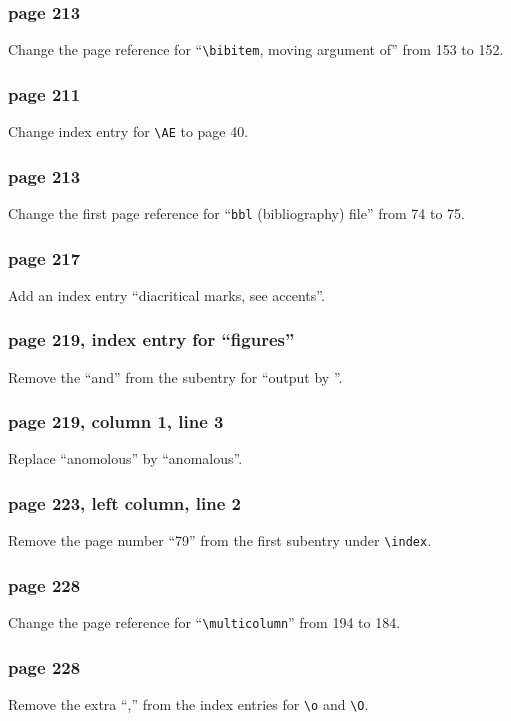 \subsubsection*{page 213}
Change the page reference for ``\verb|\bibitem|, moving argument of''
from 153 to 152.

\subsubsection*{page 211}
Change index entry for \verb|\AE| to page 40.

\subsubsection*{page 213}
Change the first page reference for ``{\tt bbl} (bibliography) file''
from 74 to 75.

\subsubsection*{page 217}
Add an index entry ``diacritical marks, see accents''.

\subsubsection*{page 219, index entry for ``figures''}
Remove the ``and'' from the subentry for ``output by
\verb||''.

\subsubsection*{page 219, column 1, line 3}
Replace ``anomolous'' by ``anomalous''.

\subsubsection*{page 223, left column, line 2}
Remove the page number ``79'' from the first subentry
under \verb|\index|.

\subsubsection*{page 228}
Change the page reference for ``\verb|\multicolumn|''
from 194  to 184.

\subsubsection*{page 228}
Remove the extra ``,'' from the index entries for \verb|\o|
and \verb|\O|.
